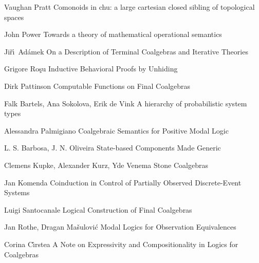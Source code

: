 
   {Vaughan Pratt}
   {Comonoids in chu: a large cartesian closed sibling of topological spaces}

 {John Power}
 {Towards a theory of mathematical operational semantics}

 {Ji\v r\'\i\ Ad\'amek}
 {On a Description of Terminal Coalgebras and Iterative Theories}

 {Grigore Ro\c{s}u}
 {Inductive Behavioral Proofs by Unhiding}

 {Dirk Pattinson}
 {Computable Functions on Final Coalgebras}

 {Falk Bartels, Ana Sokolova, Erik de Vink}
 {A hierarchy of probabilistic system types}

 {Alessandra Palmigiano}
 {Coalgebraic Semantics for Positive Modal Logic}

 {L. S. Barbosa, J. N. Oliveira}
 {State-based Components Made Generic}

 {Clemens Kupke, Alexander Kurz, Yde Venema }
 {Stone Coalgebras}

 {Jan Komenda}
 {Coinduction in Control of Partially Observed Discrete-Event Systems}

 {Luigi Santocanale}
 {Logical Construction of Final Coalgebras}

 {Jan Rothe, Dragan Ma\v{s}ulovi\'c}
 {Modal Logics for Observation Equivalences}

 {Corina C\^{\i}rstea}
 {A Note on Expressivity and Compositionality in Logics for Coalgebras}

